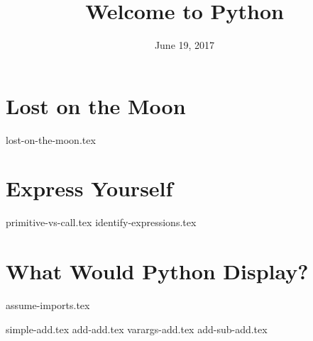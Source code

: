 \documentclass{exam}
\title{Welcome to Python}
\date{June 19, 2017}
\begin{document}
\maketitle

\section{Lost on the Moon}
{lost-on-the-moon.tex}

\section{Express Yourself}
\begin{questions}
{primitive-vs-call.tex}
{identify-expressions.tex}
\end{questions}

\section{What Would Python Display?}
{assume-imports.tex}
\begin{questions}
{simple-add.tex}
{add-add.tex}
{varargs-add.tex}
{add-sub-add.tex}
\end{questions}
\end{document}
